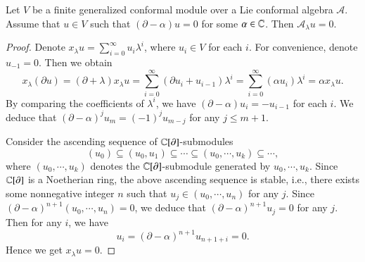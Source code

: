 \documentclass[12pt]{amsart}
\begin{document}

\begin{lem}\label{lem-tor3}
Let $V$ be a finite generalized conformal module  over a Lie conformal algebra $\mathcal{A}$.
Assume that $u\in V$ such that $(\partial-\alpha)u=0$ for some $\alpha\in\mathbb{C}$.
Then $\mathcal{A}_\lambda u=0$.
\end{lem}
\begin{proof}
Denote $x_\lambda u=\sum_{i=0}^\infty u_i\lambda^i$, where $u_i\in V$ for each $i$. For convenience, denote $u_{-1}=0$.
Then we obtain
$$x_\lambda(\partial u)=(\partial+\lambda)x_\lambda u
=\sum_{i=0}^\infty (\partial u_i+u_{i-1})\lambda^i
=\sum_{i=0}^\infty (\alpha u_i)\lambda^i=\alpha x_\lambda u.$$
By comparing the coefficients of $\lambda^i$, we have $(\partial-\alpha)u_i=-u_{i-1}$ for each $i$.
We deduce that $(\partial-\alpha)^ju_m=(-1)^ju_{m-j}$ for any $j\leq m+1$.

Consider the ascending sequence of $\mathbb{C}[\partial]$-submodules
$$(u_0)\subseteq (u_0,u_1)\subseteq\cdots \subseteq (u_0,\cdots,u_k)\subseteq\cdots,$$
where $(u_0,\cdots,u_k)$ denotes the $\mathbb{C}[\partial]$-submodule generated by $u_0,\cdots,u_k$.
Since $\mathbb{C}[\partial]$ is a Noetherian ring, the above ascending sequence is stable, i.e.,
there exists some nonnegative integer $n$ such that $u_j\in (u_0,\cdots,u_n)$ for any $j$.
Since $(\partial-\alpha)^{n+1}(u_0,\cdots,u_n)=0$,
we deduce that $(\partial-\alpha)^{n+1}u_j=0$ for any $j$.
Then for any $i$, we have $$u_i=(\partial-\alpha)^{n+1}u_{n+1+i}=0.$$
Hence we get $x_\lambda u=0$.
\end{proof}
\end{document}
